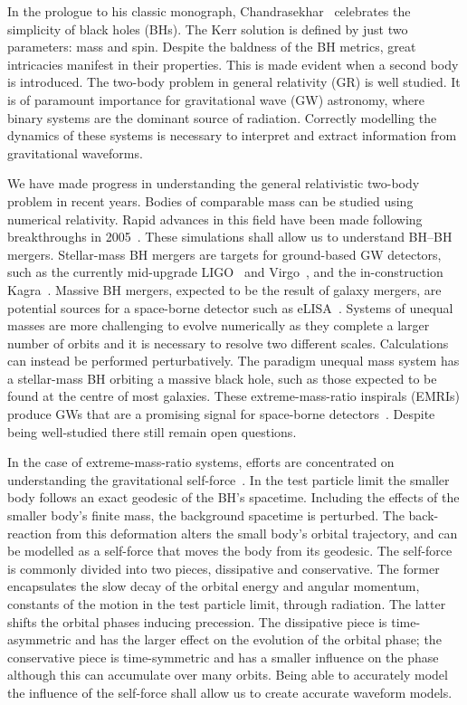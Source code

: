 \documentclass[aps,prd,amsfonts,amssymb,amsmath,nofootinbib,reprint,showpacs]{revtex4}
\begin{document}
In the prologue to his classic monograph, Chandrasekhar~\cite{Chandrasekhar1992} celebrates the simplicity of black holes (BHs). The Kerr solution is defined by just two parameters: mass and spin. Despite the baldness of the BH metrics, great intricacies manifest in their properties. This is made evident when a second body is introduced. The two-body problem in general relativity (GR) is well studied. It is of paramount importance for gravitational wave (GW) astronomy, where binary systems are the dominant source of radiation. Correctly modelling the dynamics of these systems is necessary to interpret and extract information from gravitational waveforms.

We have made progress in understanding the general relativistic two-body problem in recent years. Bodies of comparable mass can be studied using numerical relativity. Rapid advances in this field have been made following breakthroughs in 2005~\cite{Pretorius2005,Campanelli2006,Baker2006}. These simulations shall allow us to understand BH--BH mergers. Stellar-mass BH mergers are targets for ground-based GW detectors, such as the currently mid-upgrade LIGO~\cite{Harry2010} and Virgo~\cite{Accadia2011}, and the in-construction Kagra~\cite{Kuroda2010}. Massive BH mergers, expected to be the result of galaxy mergers, are potential sources for a space-borne detector such as eLISA~\cite{Amaro-Seoane2012a}. Systems of unequal masses are more challenging to evolve numerically as they complete a larger number of orbits and it is necessary to resolve two different scales. Calculations can instead be performed perturbatively. The paradigm unequal mass system has a stellar-mass BH orbiting a massive black hole, such as those expected to be found at the centre of most galaxies. These extreme-mass-ratio inspirals (EMRIs) produce GWs that are a promising signal for space-borne detectors~\cite{Amaro-Seoane2007}. Despite being well-studied there still remain open questions.

In the case of extreme-mass-ratio systems, efforts are concentrated on understanding the gravitational self-force~\cite{Barack2009,Poisson2004}. In the test particle limit the smaller body follows an exact geodesic of the BH's spacetime. Including the effects of the smaller body's finite mass, the background spacetime is perturbed. The back-reaction from this deformation alters the small body's orbital trajectory, and can be modelled as a self-force that moves the body from its geodesic. The self-force is commonly divided into two pieces, dissipative and conservative. The former encapsulates the slow decay of the orbital energy and angular momentum, constants of the motion in the test particle limit, through radiation. The latter shifts the orbital phases inducing precession. The dissipative piece is time-asymmetric and has the larger effect on the evolution of the orbital phase; the conservative piece is time-symmetric and has a smaller influence on the phase although this can accumulate over many orbits. Being able to accurately model the influence of the self-force shall allow us to create accurate waveform models.
\end{document}
